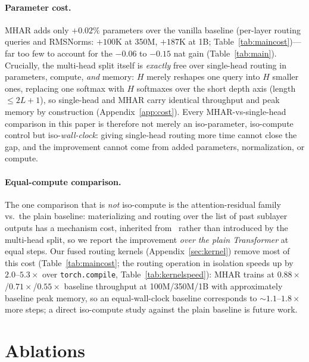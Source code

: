 \documentclass{article}
\begin{document}
\paragraph{Parameter cost.} MHAR adds only $+0.02\%$ parameters over the vanilla
baseline (per-layer routing queries and RMSNorms: $+100$K at 350M, $+187$K at
1B; Table~\ref{tab:maincost})---far too few to account for the $-0.06$ to
$-0.15$ nat gain (Table~\ref{tab:main}). Crucially, the
multi-head split itself is \emph{exactly} free over single-head routing in
parameters, compute, \emph{and} memory: $H$ merely reshapes one query into $H$
smaller ones, replacing one softmax with $H$ softmaxes over the short depth axis
(length $\le 2L{+}1$), so single-head and MHAR carry identical throughput and peak
memory by construction (Appendix~\ref{app:cost}). Every MHAR-vs-single-head
comparison in this paper is therefore not merely an iso-parameter, iso-compute
control but iso-\emph{wall-clock}: giving single-head routing more time cannot
close the gap, and the improvement cannot come from added parameters,
normalization, or compute.

\paragraph{Equal-compute comparison.} The one comparison that is \emph{not}
iso-compute is the attention-residual family vs.\ the plain baseline:
materializing and routing over the list of past sublayer outputs has a mechanism
cost, inherited from~\citet{kimi2025attention} rather than introduced by the
multi-head split, so we report the improvement \emph{over the plain Transformer}
at equal steps. Our fused routing kernels (Appendix~\ref{sec:kernel}) remove most
of this cost (Table~\ref{tab:maincost}; the routing operation in isolation speeds
up by $2.0$--$5.3\times$ over \texttt{torch.compile}, Table~\ref{tab:kernelspeed}): MHAR trains at
$0.88\times$/$0.71\times$/$0.55\times$ baseline throughput at 100M/350M/1B with
approximately baseline peak memory, so an equal-wall-clock baseline corresponds to
${\sim}1.1$--$1.8\times$ more steps; a direct iso-compute study against the plain
baseline is future work.

\section{Ablations}
\label{sec:ablation}
\end{document}
